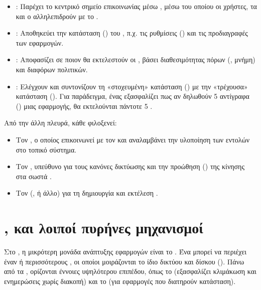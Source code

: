 
\begin{itemize}
  \item \textbf{}: Παρέχει το κεντρικό σημείο επικοινωνίας μέσω  , μέσω του οποίου οι χρήστες, τα  και ο  αλληλεπιδρούν με το  .
  \item \textbf{}: Αποθηκεύει την κατάσταση () του , π.χ. τις ρυθμίσεις () και τις προδιαγραφές των εφαρμογών.
  \item \textbf{}: Αποφασίζει σε ποιον  θα εκτελεστούν οι , βάσει διαθεσιμότητας πόρων (, μνήμη) και διαφόρων πολιτικών.
  \item \textbf{}: Ελέγχουν και συντονίζουν τη «στοχευμένη» κατάσταση () με την «τρέχουσα» κατάσταση (). Για παράδειγμα, ένας  εξασφαλίζει πως αν δηλωθούν 5 αντίγραφα () μιας εφαρμογής, θα εκτελούνται πάντοτε 5 .
\end{itemize}

Από την άλλη πλευρά, κάθε  φιλοξενεί:
\begin{itemize}
  \item Τον \textbf{}, ο οποίος επικοινωνεί με τον  και αναλαμβάνει την υλοποίηση των εντολών στο τοπικό σύστημα.
  \item Τον \textbf{}, υπεύθυνο για τους κανόνες δικτύωσης και την προώθηση () της κίνησης στα σωστά .
  \item Τον \textbf{} (,  ή άλλο) για τη δημιουργία και εκτέλεση .
\end{itemize}

\section{,  και λοιποί πυρήνες μηχανισμοί}

Στο , η μικρότερη μονάδα ανάπτυξης εφαρμογών είναι το . Ένα  μπορεί να περιέχει έναν ή περισσότερους , οι οποίοι μοιράζονται το ίδιο  δικτύου και δίσκου (). Πάνω από τα , ορίζονται έννοιες υψηλότερου επιπέδου, όπως το  (εξασφαλίζει κλιμάκωση και ενημερώσεις χωρίς διακοπή) και το  (για εφαρμογές που διατηρούν κατάσταση).

